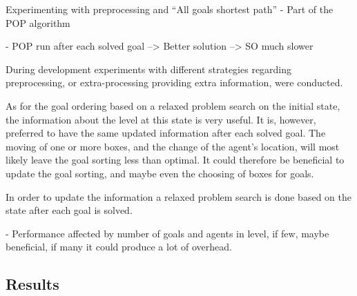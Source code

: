 \documentclass[Main]{subfiles}
\begin{document}
Experimenting with preprocessing and ``All goals shortest path'' 
- Part of the POP algorithm

- POP run after each solved goal 
--> Better solution --> SO much slower


During development experiments with different strategies regarding preprocessing, or extra-processing providing extra information, were conducted. 

As for the goal ordering based on a relaxed problem search on the initial state, the information about the level at this state is very useful. It is, however, preferred to have the same updated information after each solved goal. The moving of one or more boxes, and the change of the agent's location, will most likely leave the goal sorting less than optimal. It could therefore be beneficial to update the goal sorting, and maybe even the choosing of boxes for goals. 

In order to update the information a relaxed problem search is done based on the state after each goal is solved. 


- Performance affected by number of goals and agents in level, if few, maybe beneficial, if many it could produce a lot of overhead.






\subsection{Results}
\end{document}
